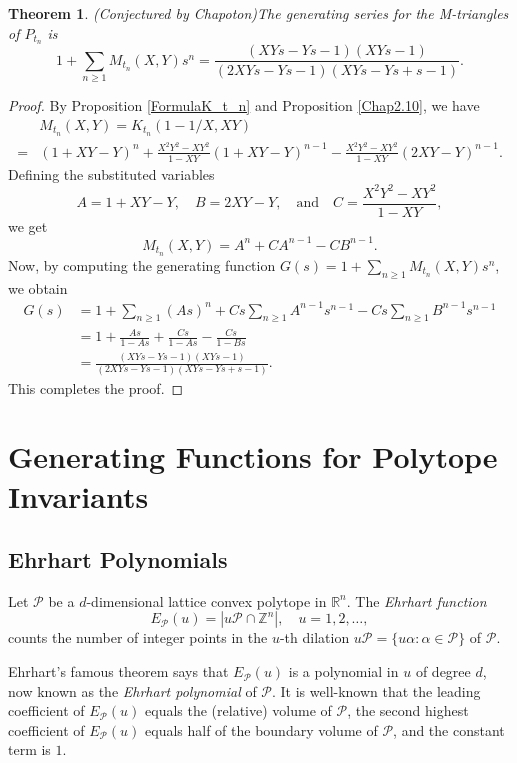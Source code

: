 \documentclass[reqno, 12pt]{article}
\newtheorem{thm}{Theorem}[section]
\theoremstyle{mydefinition}
\theoremstyle{myremark}
\begin{document}
\begin{thm}{\em (Conjectured by Chapoton)}\label{Arbor-Theorem-2}
The generating series for the M-triangles of $P_{t_n}$ is 
\[ 1 + \sum_{n \ge 1} M_{t_n}(X,Y) s^n = \frac{(XYs - Ys - 1)(XYs - 1)}{(2XYs - Ys - 1)(XYs - Ys + s - 1)}. \]
\end{thm}
\begin{proof}
By Proposition \ref{FormulaK_t_n} and  Proposition \ref{Chap2.10}, we have
\begin{align*}
&M_{t_n}(X,Y)= K_{t_n}(1 - 1/X, XY)\\
=& (1+XY-Y)^n + \frac{X^{2}Y^{2}-XY^{2}}{1-XY} (1+XY-Y)^{n-1} - \frac{X^{2}Y^{2}-XY^{2}}{1-XY} (2XY-Y)^{n-1}.
\end{align*}
Defining the substituted variables 
$$A = 1+XY-Y,\quad B = 2XY-Y,\quad \text{and}\quad C = \frac{X^2Y^2-XY^2}{1-XY},$$
we get 
$$M_{t_n}(X,Y) = A^n + C A^{n-1} - C B^{n-1}.$$
Now, by computing the generating function $G(s) = 1 + \sum\limits_{n\geq1} M_{t_n}(X,Y) s^n$, we obtain
\begin{align*}
G(s) &= 1 + \sum_{n\geq1} (As)^n + Cs \sum_{n\geq1} A^{n-1}s^{n-1} - Cs \sum_{n\geq1} B^{n-1}s^{n-1} \\
&= 1 + \frac{As}{1-As} + \frac{Cs}{1-As} - \frac{Cs}{1-Bs} \\
&=\frac{(XYs - Ys - 1)(XYs - 1)}{(2XYs - Ys - 1)(XYs - Ys + s - 1)}.
\end{align*}
This completes the proof.
\end{proof}


\section{Generating Functions for Polytope Invariants}\label{Section-3-polytopes}

\subsection{Ehrhart Polynomials}

Let $\mathcal{P}$ be a $d$-dimensional lattice convex polytope in $\mathbb{R}^n$.  
The \emph{Ehrhart function}  
$$E_{\mathcal{P}}(u)=|u\mathcal{P}\cap \mathbb{Z}^n|,\quad u=1,2,\ldots,$$
counts the number of integer points in the $u$-th dilation $u\mathcal{P} = \{ u\alpha : \alpha \in \mathcal{P} \}$ of $\mathcal{P}$.

Ehrhart's famous theorem \cite{Ehrhart62} says that $E_{\mathcal{P}}(u)$ is a polynomial in $u$ of degree $d$, now known as the \emph{Ehrhart polynomial} of $\mathcal{P}$. 
It is well-known \cite[Corollary 3.20; Theorem 5.6]{BeckRobins} that the leading coefficient of $E_{\mathcal{P}}(u)$ equals the (relative) volume of $\mathcal{P}$, the second highest coefficient of $E_{\mathcal{P}}(u)$ equals half of the boundary volume of $\mathcal{P}$, and the constant term is $1$.
\end{document}
